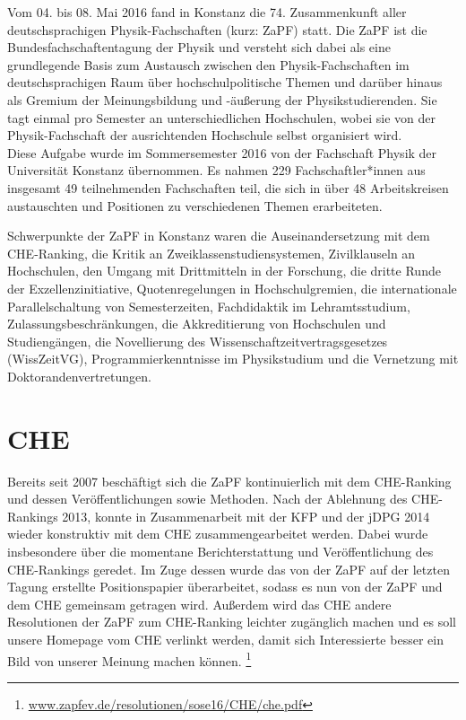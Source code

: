 Vom 04. bis 08. Mai 2016 fand in Konstanz die 74. Zusammenkunft aller 
deutschsprachigen Physik-Fachschaften (kurz: ZaPF) statt. Die ZaPF ist die 
Bundesfachschaftentagung der Physik und versteht sich dabei als eine 
grundlegende Basis zum Austausch zwischen den Physik-Fachschaften im 
deutschsprachigen Raum über hochschulpolitische Themen und darüber hinaus als 
Gremium der Meinungsbildung und -äußerung der Physikstudierenden. Sie tagt 
einmal pro Semester an unterschiedlichen Hochschulen, wobei sie von der 
Physik-Fachschaft der ausrichtenden Hochschule selbst organisiert wird. \\

Diese Aufgabe wurde im Sommersemester 2016 von der Fachschaft Physik der 
Universität Konstanz übernommen. Es nahmen 229 Fachschaftler*innen aus 
insgesamt 49 teilnehmenden Fachschaften teil, die sich in über 48 
Arbeitskreisen austauschten und Positionen zu verschiedenen Themen erarbeiteten.

Schwerpunkte der ZaPF in Konstanz waren die Auseinandersetzung mit dem 
CHE-Ranking, die Kritik an Zweiklassenstudiensystemen, Zivilklauseln an 
Hochschulen, den Umgang mit Drittmitteln in der Forschung, die dritte Runde der 
Exzellenzinitiative, Quotenregelungen in Hochschulgremien, die internationale 
Parallelschaltung von Semesterzeiten, Fachdidaktik im Lehramtsstudium, 
Zulassungsbeschränkungen, die Akkreditierung von Hochschulen und Studiengängen, 
die Novellierung des Wissenschaftzeitvertragsgesetzes (WissZeitVG), 
Programmierkenntnisse im Physikstudium und die Vernetzung mit 
Doktorandenvertretungen.

\newpage

\section*{CHE}  
Bereits seit 2007 beschäftigt sich die ZaPF kontinuierlich mit dem CHE-Ranking 
und dessen Veröffentlichungen sowie Methoden. Nach der Ablehnung des 
CHE-Rankings 2013, konnte in Zusammenarbeit mit der KFP und der jDPG 2014 
wieder konstruktiv mit dem CHE zusammengearbeitet werden. Dabei wurde 
insbesondere über die momentane Berichterstattung und Veröffentlichung des 
CHE-Rankings geredet. Im Zuge dessen wurde das von der ZaPF auf der letzten 
Tagung erstellte Positionspapier überarbeitet, sodass es nun von der ZaPF und 
dem CHE gemeinsam getragen wird. Außerdem wird das CHE andere Resolutionen der 
ZaPF zum CHE-Ranking leichter zugänglich machen und es soll unsere Homepage vom 
CHE verlinkt werden, damit sich Interessierte besser ein Bild von unserer 
Meinung machen können. 
\footnote{\href{http://www.zapfev.de/resolutionen/sose16/CHE/che.pdf}{\url{www.zapfev.de/resolutionen/sose16/CHE/che.pdf}}}

